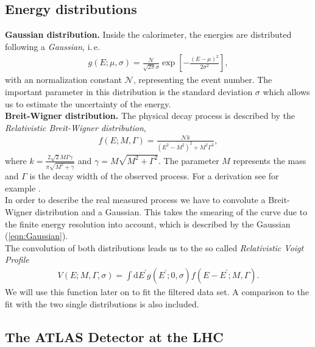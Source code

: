 \documentclass[twocolumn,
			   showpacs,%
               nofootinbib,
               aps,%
               prd,
               notitlepage,
               showkeys,
               10pt]{revtex4-1}
\begin{document}
\subsection{Energy distributions}
\textbf{Gaussian distribution.} Inside the calorimeter, the energies are distributed following a \textit{Gaussian}, i.\,e. 
\begin{align}
g(E ; \mu, \sigma)=\frac{\mathcal{N}}{\sqrt{2 \pi} \sigma} \exp \left[-\frac{(E-\mu)^{2}}{2 \sigma^{2}}\right],
\label{eqn:Gaussian}
\end{align}
with an normalization constant $\mathcal{N}$, representing the event number. The important parameter in this distribution is the standard deviation $\sigma$ which allows us to estimate the uncertainty of the energy.\\

\textbf{Breit-Wigner distribution.} The physical decay process is described by the \textit{Relativistic Breit-Wigner distribution}, 
\begin{align}
	f(E ; M, \Gamma)=\frac{\mathcal{N} k}{\left(E^{2}-M^{2}\right)^{2}+M^{2} \Gamma^{2}},
\end{align}
where $k=\frac{2 \sqrt{2} M \Gamma \gamma}{\pi \sqrt{M^{2}+\gamma}}$ and $\gamma=M \sqrt{M^{2}+\Gamma^{2}}$. The parameter $M$ represents the mass and $\Gamma$ is the decay width of the observed process. For a derivation see for example \cite{BohmSato2004}. \\

In order to describe the real measured process we have to convolute a Breit-Wigner distribution and a Gaussian. This takes the smearing of the curve due to the finite energy resolution into account, which is described by the Gaussian (\ref{eqn:Gaussian}). \\

The convolution of both distributions leads us to the so called \textit{Relativistic Voigt Profile}
\begin{align}
	V(E ; M, \Gamma, \sigma)=\int \mathrm{d} E^{\prime} g\left(E^{\prime} ; 0, \sigma\right) f\left(E-E^{\prime} ; M, \Gamma\right).
\end{align}
We will use this function later on to fit the filtered data set. A comparison to the fit with the two single distributions is also included. 
\subsection{The ATLAS Detector at the LHC}
\end{document}
